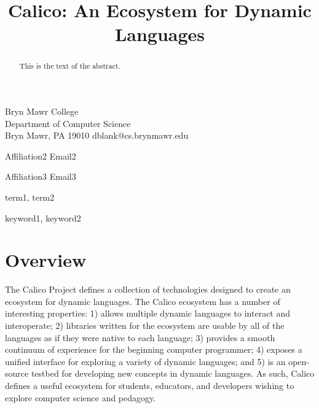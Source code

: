 \documentclass[preprint]{sigplanconf}
\begin{document}


\title{Calico: An Ecosystem for Dynamic Languages}

           {Bryn Mawr College\\Department of Computer Science\\Bryn Mawr, PA 19010}
           {dblank@cs.brynmawr.edu}

           {Affiliation2}
           {Email2}

           {Affiliation3}
           {Email3}

\maketitle

\begin{abstract}
This is the text of the abstract.
\end{abstract}


\terms
term1, term2

\keywords
keyword1, keyword2

\section{Overview}

The Calico Project defines a collection of technologies designed to
create an ecosystem for dynamic languages. The Calico ecosystem has a
number of interesting properties: 1) allows multiple dynamic languages
to interact and interoperate; 2) libraries written for the ecosystem
are usable by all of the languages as if they were native to each
language; 3) provides a smooth continuum of experience for the
beginning computer programmer; 4) exposes a unified interface for
exploring a variety of dynamic languages; and 5) is an open-source
testbed for developing new concepts in dynamic languages. As such,
Calico defines a useful ecosystem for students, educators, and
developers wishing to explore computer science and pedagogy.
\end{document}
